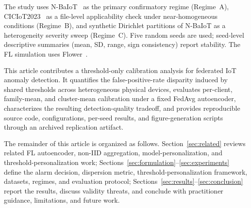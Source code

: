 The study uses N-BaIoT~\cite{meidan2018n} as the primary confirmatory regime (Regime~A),
CICIoT2023~\cite{neto2023ciciot2023} as a file-level applicability check under
near-homogeneous conditions (Regime~B), and synthetic Dirichlet partitions of N-BaIoT as a
heterogeneity severity sweep (Regime~C).
Five random seeds are used; seed-level descriptive summaries (mean, SD, range, sign consistency) report stability.
The FL simulation uses Flower~\cite{beutel2020flower}.

This article contributes a threshold-only calibration analysis for federated IoT
anomaly detection. It quantifies the false-positive-rate disparity induced by shared
thresholds across heterogeneous physical devices, evaluates per-client, family-mean,
and cluster-mean calibration under a fixed FedAvg autoencoder, characterizes the
resulting detection-quality tradeoff, and provides reproducible source code,
configurations, per-seed results, and figure-generation scripts through an
archived replication artifact.

The remainder of this article is organized as follows. Section~\ref{sec:related}
reviews related FL autoencoder, non-IID aggregation, model-personalization, and
threshold-personalization work; Sections~\ref{sec:formulation}--\ref{sec:experiments}
define the alarm decision, dispersion metric, threshold-personalization framework,
datasets, regimes, and evaluation protocol;
Sections~\ref{sec:results}--\ref{sec:conclusion} report the results, discuss validity
threats, and conclude with practitioner guidance, limitations, and future work.
